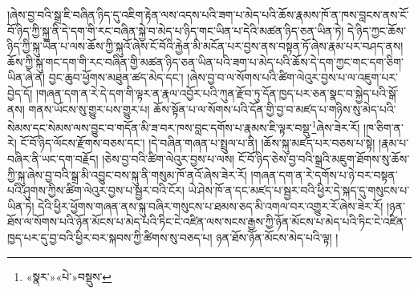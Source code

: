 །ཞེས་བྱ་བའི་སྒྲ་ཇི་བཞིན་ཉིད་དུ་འཇིག་རྟེན་ལས་འདས་པའི་ཟག་པ་མེད་པའི་ཆོས་རྣམས་ཁོ་ན་ཁས་བླངས་ནས་ངོ་བོ་ཉིད་ཀྱི་སྐུ་ནི་དེ་དག་གི་རང་བཞིན་སྐྱེ་བ་མེད་པ་ཉིད་གང་ཡིན་པ་དེའི་མཚན་ཉིད་ཅན་ཡིན་ཏེ། དེ་ཉིད་ཀྱང་ཆོས་ཉིད་ཀྱི་སྐུ་ཡིན་པ་ལས་ཆོས་ཀྱི་སྐུའོ་ཞེས་ངོ་བོའི་རྐྱེན་མི་མངོན་པར་བྱས་ནས་བསྟན་ཏོ་ཞེས་རྣམ་པར་བཤད་ནས། ཆོས་ཀྱི་སྐུ་གང་དག་གི་རང་བཞིན་གྱི་མཚན་ཉིད་ཅན་ཡིན་པའི་ཟག་པ་མེད་པའི་ཆོས་དེ་དག་ཀྱང་གང་དག་ཅིག་ཡིན་ཞེ་ན། བྱང་ཆུབ་ཕྱོགས་མཐུན་ཚད་མེད་དང་། །ཞེས་བྱ་བ་ལ་སོགས་པའི་ཚིག་ལེའུར་བྱས་པ་ལ་འཇུག་པར་བྱེད་དོ། །གཞན་དག་ན་རེ་དེ་དག་གི་ལྟར་ན་རྣལ་འབྱོར་པའི་ཀུན་རྫོབ་ཏུ་དོན་ཁྱད་པར་ཅན་སྣང་བ་སྐྱེད་པའི་སྒོ་ནས། གནས་ཡོངས་སུ་གྱུར་པས་གྱུར་པ། ཆོས་སྟོན་པ་ལ་སོགས་པའི་དོན་གྱི་བྱ་བ་མཛད་པ་གཉིས་སུ་མེད་པའི་སེམས་དང་སེམས་ལས་བྱུང་བ་གདོན་མི་ཟ་བར་ཁས་བླང་དགོས་པ་རྣམས་ཇི་ལྟར་བསྡུ་\footnote{«སྣར་»«པེ་»བསྡུས་}ཞེས་ཟེར་རོ། །ཁ་ཅིག་ན་རེ། ངོ་བོ་ཉིད་ལོངས་རྫོགས་བཅས་དང་། །དེ་བཞིན་གཞན་པ་སྤྲུལ་པ་ནི། །ཆོས་སྐུ་མཛད་པར་བཅས་པ་སྟེ། །རྣམ་པ་བཞིར་ནི་ཡང་དག་བརྗོད། །ཅེས་བྱ་བའི་ཚིག་ལེའུར་བྱས་པ་ལས། ངོ་བོ་ཉིད་ཅེས་བྱ་བའི་སྒྲའི་མཇུག་ཐོགས་སུ་ཆོས་ཀྱི་སྐུ་ཞེས་བྱ་བའི་སྒྲ་མི་འབྱུང་བས་སྐུ་ནི་གསུམ་ཁོ་ནའོ་ཞེས་ཟེར་རོ། །གཞན་དག་ན་རེ་དགོས་པ་ཉེ་བར་བསྟན་པའི་ཤུགས་ཀྱིས་ཚིག་ལེའུར་བྱས་པ་སྦྱར་བའི་ངོར། ཡེ་ཤེས་ཁོ་ན་དང་མཛད་པ་སྦྱར་བའི་ཕྱིར་དེ་སྐད་དུ་གསུངས་པ་ཡིན་ཏེ། དེའི་ཕྱིར་ཕྱོགས་གཞན་ནས་སྐུ་བཞིར་གསུངས་པ་ཐམས་ཅད་མི་འགལ་བར་འགྱུར་རོ་ཞེས་ཟེར་རོ། །ཉན་ཐོས་ལ་སོགས་པའི་ཉོན་མོངས་པ་མེད་པའི་ཏིང་ངེ་འཛིན་ལས་སངས་རྒྱས་ཀྱི་ཉོན་མོངས་པ་མེད་པའི་ཏིང་ངེ་འཛིན་ཁྱད་པར་དུ་བྱ་བའི་ཕྱིར་བར་སྐབས་ཀྱི་ཚིགས་སུ་བཅད་པ། ཉན་ཐོས་ཉོན་མོངས་མེད་པའི་ལྟ། །
